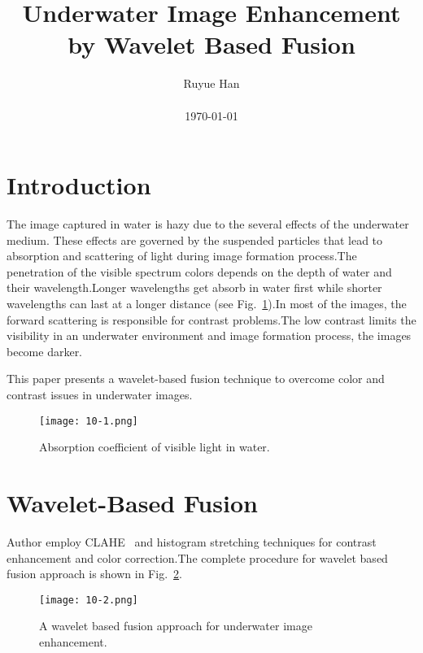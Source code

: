 \documentclass[10pt,twocolumn,letterpaper]{article}
\begin{document}
\title{Underwater Image Enhancement by Wavelet Based Fusion}

\author{Ruyue Han\\\\ \today}

\maketitle

\section{Introduction}
The image captured in water is hazy due to the several effects of the underwater medium. These effects are governed by the suspended particles that lead to absorption and scattering of light during image formation process.The penetration of the visible spectrum colors depends on the depth of water and their wavelength.Longer wavelengths get absorb in water first while shorter wavelengths can last at a longer distance (see Fig.~\ref{fig:firstpicture}).In most of the images, the forward scattering is responsible for contrast problems.The low contrast limits the visibility in an underwater environment and image formation
process, the images become darker.\par
This paper presents a wavelet-based fusion technique to overcome color and contrast issues in underwater images.
\begin{figure}[htb]
\centering
\texttt{[image: 10-1.png]}
\caption{Absorption coefficient of visible light in water.}
\label{fig:firstpicture}
\end{figure}
\section{Wavelet-Based Fusion}
Author employ CLAHE~\cite{Fuzzy_2012_1} and histogram stretching techniques for contrast enhancement and color correction.The complete procedure for wavelet based fusion approach is shown in Fig.~\ref{fig:secondpicture}.
\begin{figure}[htb]
\centering
\texttt{[image: 10-2.png]}
\caption{A wavelet based fusion approach for underwater image enhancement.}
\label{fig:secondpicture}
\end{figure}
\end{document}
